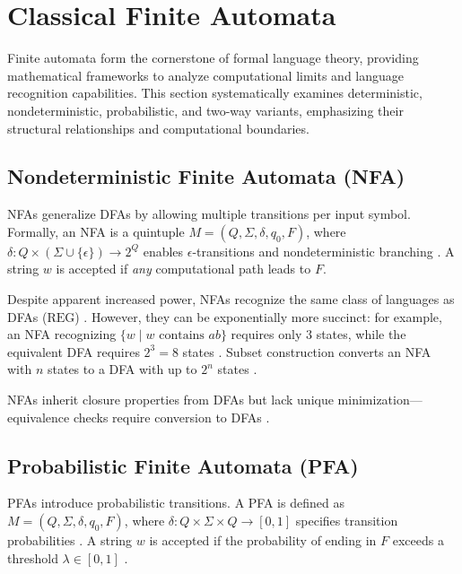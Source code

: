 \section{Classical Finite Automata}
\label{sec:classical-finite-automata} 

Finite automata form the cornerstone of formal language theory, providing mathematical frameworks to analyze computational limits and language recognition capabilities. This section systematically examines deterministic, nondeterministic, probabilistic, and two-way variants, emphasizing their structural relationships and computational boundaries. 






\subsection{Nondeterministic Finite Automata (NFA)}
\label{subsec:nfa} 

NFAs generalize DFAs by allowing multiple transitions per input symbol. Formally, an NFA is a quintuple $M = (Q, \Sigma, \delta, q_0, F)$, where $\delta: Q \times (\Sigma \cup \{\epsilon\}) \to 2^Q$ enables $\epsilon$-transitions and nondeterministic branching \cite{hopcroft2006introduction}. A string $w$ is accepted if \textit{any} computational path leads to $F$. 

Despite apparent increased power, NFAs recognize the same class of languages as DFAs ($\text{REG}$) \cite{hopcroft2006introduction}. However, they can be exponentially more succinct: for example, an NFA recognizing $\{w \mid w \text{ contains } ab\}$ requires only $3$ states, while the equivalent DFA requires $2^3 = 8$ states \cite{hopcroft2006introduction}. Subset construction converts an NFA with $n$ states to a DFA with up to $2^n$ states \cite{hopcroft2006introduction}. 

NFAs inherit closure properties from DFAs but lack unique minimization—equivalence checks require conversion to DFAs \cite{hopcroft2006introduction}. 

\subsection{Probabilistic Finite Automata (PFA)}
\label{subsec:pfa} 

PFAs introduce probabilistic transitions. A PFA is defined as $M = (Q, \Sigma, \delta, q_0, F)$, where $\delta: Q \times \Sigma \times Q \to [0, 1]$ specifies transition probabilities \cite{rabin1963probabilistic}. A string $w$ is accepted if the probability of ending in $F$ exceeds a threshold $\lambda \in [0, 1]$ \cite{rabin1963probabilistic}. 

